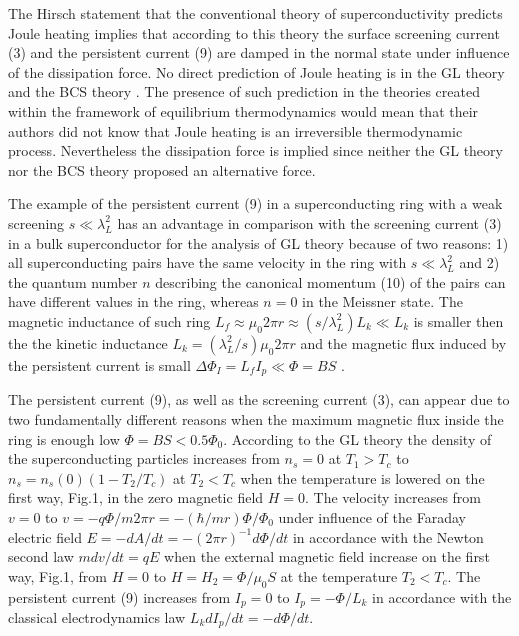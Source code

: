\documentclass[twocolumn,secnumarabic,amssymb, nobibnotes, aps, prd]{revtex4}
\begin{document}
The Hirsch statement that the conventional theory of superconductivity predicts Joule heating \cite{Hirsch2020Physica,Hirsch2020EPL,Hirsch2020ModPhys} implies that according to this theory \cite{GL1950,BCS1957} the surface screening current (3) and the persistent current (9) are damped in the normal state under influence of the dissipation force. No direct prediction of Joule heating is in the GL theory \cite{GL1950} and the BCS theory \cite{BCS1957}. The presence of such prediction in the theories created within the framework of equilibrium thermodynamics would mean that their authors did not know that Joule heating is an irreversible thermodynamic process. Nevertheless the dissipation force is implied since neither the GL theory \cite{GL1950} nor the BCS theory \cite{BCS1957} proposed an alternative force. 

The example of the persistent current (9) in a superconducting ring with a weak screening $s \ll \lambda _{L}^{2}$ has an advantage in comparison with the screening current (3) in a bulk superconductor for the analysis of GL theory \cite{GL1950} because of two reasons: 1) all superconducting pairs have the same velocity in the ring with $s \ll \lambda _{L}^{2}$ and 2) the quantum number $n$ describing the canonical momentum (10) of the pairs can have different values in the ring, whereas $n = 0$ in the Meissner state. The magnetic inductance of such ring $L_{f} \approx \mu_{0}2\pi r \approx (s/\lambda _{L}^{2})L_{k} \ll L_{k}$ is smaller then the the kinetic inductance $L_{k} = (\lambda _{L}^{2}/s)\mu_{0}2\pi r $ and the magnetic flux induced by the persistent current is small $\Delta \Phi _{I} = L_{f}I_{p} \ll \Phi = BS$ \cite{QuanStud2016}.   

The persistent current (9), as well as the screening current (3), can appear due to two fundamentally different reasons when the maximum magnetic flux inside the ring is enough low $\Phi = BS < 0.5\Phi_{0}$. According to the GL theory the density of the superconducting particles increases from $n_{s} = 0$ at $T_{1} > T_{c}$ to $n_{s} = n_{s}(0)(1-T_{2}/T_{c})$ at $T_{2} < T_{c}$ when the temperature is lowered on the first way, Fig.1, in the zero magnetic field $H = 0$. The velocity increases from $v = 0$ to $v = -q\Phi /m 2\pi r = -(\hbar /mr)\Phi /\Phi_{0}$ under influence of the Faraday electric field $E = -dA/dt = -(2\pi r)^{-1}d\Phi /dt$ in accordance with the Newton second law $mdv/dt = qE$ when the external magnetic field increase on the first way, Fig.1, from $H = 0$ to $H = H_{2} = \Phi /\mu_{0}S$ at the temperature $T_{2} < T_{c}$. The persistent current (9) increases from $I_{p} = 0$ to $I_{p} = -\Phi /L_{k}$ in accordance with the classical electrodynamics law $L_{k}dI_{p}/dt = -d\Phi /dt$. 
\end{document}
